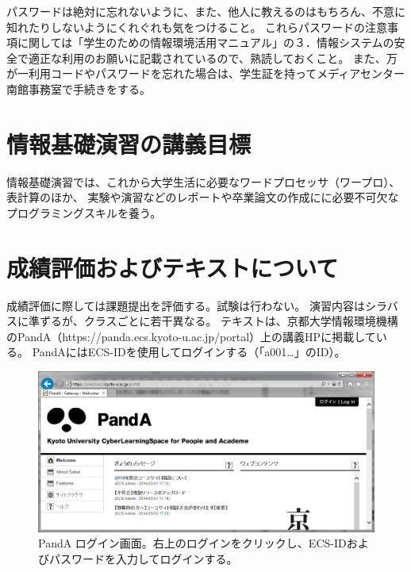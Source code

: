 パスワードは絶対に忘れないように、また、他人に教えるのはもちろん、不意に知れたりしないようにくれぐれも気をつけること。
これらパスワードの注意事項に関しては「学生のための情報環境活用マニュアル」の３．情報システムの安全で適正な利用のお願いに記載されているので、熟読しておくこと。
また、万が一利用コードやパスワードを忘れた場合は、学生証を持ってメディアセンター南館事務室で手続きをする。
　
\section{情報基礎演習の講義目標}
情報基礎演習では、これから大学生活に必要なワードプロセッサ（ワープロ）、表計算のほか、
実験や演習などのレポートや卒業論文の作成にに必要不可欠なプログラミングスキルを養う。

\section{成績評価およびテキストについて}
成績評価に際しては課題提出を評価する。試験は行わない。
演習内容はシラバスに準ずるが、クラスごとに若干異なる。
テキストは、京都大学情報環境機構のPandA（https://panda.ecs.kyoto-u.ac.jp/portal）上の講義HPに掲載している。
PandAにはECS-IDを使用してログインする（「a001…」のID）。

\begin{figure}
\centering
\includegraphics[width=13cm]{TeX_files/figs1/PandA1.png}
\caption{
\label{fig:PandA1}
PandA ログイン画面。右上のログインをクリックし、ECS-IDおよびパスワードを入力してログインする。}
\end{figure}

